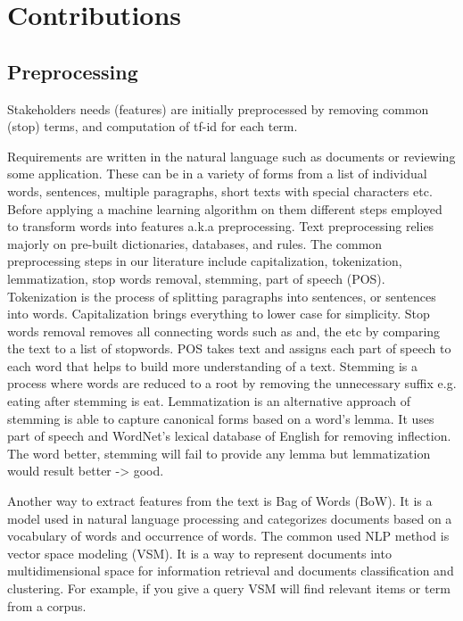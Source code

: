 \section{Contributions}
\label{sec:contributions}

\subsection{Preprocessing}
\label{sec:preprocessing}
 Stakeholders needs
(features) are initially preprocessed
by removing common (stop) terms, and computation of tf-id  for each term.

Requirements are written in the natural language such as documents or reviewing
some application. These can be in a variety of forms from a list of individual
words, sentences, multiple paragraphs, short texts with special characters etc.
Before applying a machine learning algorithm on them different steps employed to
transform words into features a.k.a preprocessing. Text preprocessing relies
majorly on pre-built dictionaries, databases, and rules. The common
preprocessing steps in our literature include capitalization, tokenization,
lemmatization, stop words removal, stemming, part of speech (POS). Tokenization
is the process of splitting paragraphs into sentences, or sentences into words.
Capitalization brings everything to lower case for simplicity. Stop words
removal removes all connecting words such as and, the etc by comparing the text
to a list of stopwords. POS takes text and assigns each part of speech to each
word that helps to build more understanding of a text. Stemming is a process
where words are reduced to a root by removing the unnecessary suffix e.g. eating
after stemming is eat. Lemmatization is an alternative approach of stemming is
able to capture canonical forms based on a word's lemma. It uses part of speech
and  WordNet’s lexical database of English for removing inflection. The word
better, stemming will fail to provide any lemma but lemmatization would result
better -> good.

 Another way to extract features from the text is Bag of Words (BoW). It is a
 model used in natural language processing and categorizes documents based on a
 vocabulary of words and occurrence of words. The common used NLP method is
 vector space modeling (VSM). It is a way to represent documents into
 multidimensional space for information retrieval and documents classification
 and clustering. For example, if you give a query VSM will find relevant items
 or term from a corpus.

